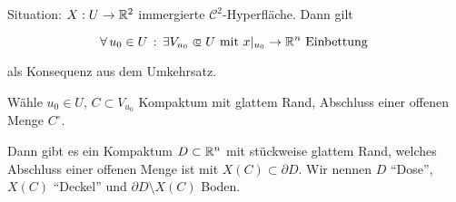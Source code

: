 \documentclass{cheat-sheet}
\begin{document}




Situation: $X : U \to \mathbb{R}^2$ immergierte $\mathcal{C}^2$-Hyperfläche. Dann gilt

\[ \fa{u_0 \in U} \exists V_{u_0} \opn U \text{ mit } x|_{u_0} \to \R^n \text{ Einbettung } \]

als Konsequenz aus dem Umkehrsatz.

Wähle $u_0 \in U$, $C \subset V_{u_0}$ Kompaktum mit glattem Rand, Abschluss einer offenen Menge $C^\circ$.

Dann gibt es ein Kompaktum $D \subset \mathbb{R}^n$ mit stückweise glattem Rand, welches Abschluss einer offenen Menge ist mit $X(C) \subset \partial D$. Wir nennen $D$ "`Dose"', $X(C)$ "`Deckel"' und $\partial D \setminus X(C)$ Boden.
\end{document}
